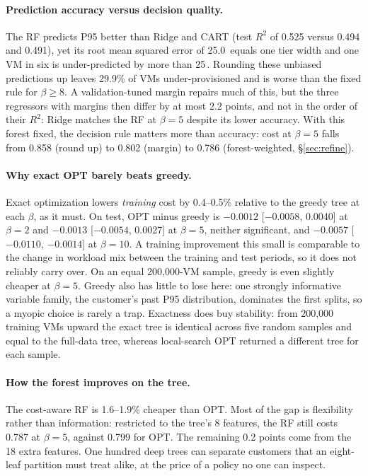 \documentclass[10pt]{article}
\newcommand{\pp}{\,\text{pp}}
\begin{document}
\paragraph{Prediction accuracy versus decision quality.} The RF predicts P95 better than Ridge and CART (test $R^2$ of 0.525 versus 0.494 and 0.491), yet its root mean squared error of 25.0\pp{} equals one tier width and one VM in six is under-predicted by more than 25\pp. Rounding these unbiased predictions up leaves 29.9\% of VMs under-provisioned and is worse than the fixed rule for $\beta\ge8$. A validation-tuned margin repairs much of this, but the three regressors with margins then differ by at most 2.2 points, and not in the order of their $R^2$: Ridge matches the RF at $\beta=5$ despite its lower accuracy. With this forest fixed, the decision rule matters more than accuracy: cost at $\beta=5$ falls from 0.858 (round up) to 0.802 (margin) to 0.786 (forest-weighted, \S\ref{sec:refine}).

\paragraph{Why exact OPT barely beats greedy.} Exact optimization lowers \emph{training} cost by 0.4--0.5\% relative to the greedy tree at each $\beta$, as it must. On test, OPT minus greedy is $-0.0012$ [$-0.0058$, 0.0040] at $\beta=2$ and $-0.0013$ [$-0.0054$, 0.0027] at $\beta=5$, neither significant, and $-0.0057$ [$-0.0110$, $-0.0014$] at $\beta=10$. A training improvement this small is comparable to the change in workload mix between the training and test periods, so it does not reliably carry over. On an equal 200,000-VM sample, greedy is even slightly cheaper at $\beta=5$. Greedy also has little to lose here: one strongly informative variable family, the customer's past P95 distribution, dominates the first splits, so a myopic choice is rarely a trap. Exactness does buy stability: from 200,000 training VMs upward the exact tree is identical across five random samples and equal to the full-data tree, whereas local-search OPT returned a different tree for each sample.

\paragraph{How the forest improves on the tree.} The cost-aware RF is 1.6--1.9\% cheaper than OPT. Most of the gap is flexibility rather than information: restricted to the tree's 8 features, the RF still costs 0.787 at $\beta=5$, against 0.799 for OPT. The remaining 0.2 points come from the 18 extra features. One hundred deep trees can separate customers that an eight-leaf partition must treat alike, at the price of a policy no one can inspect.
\end{document}
